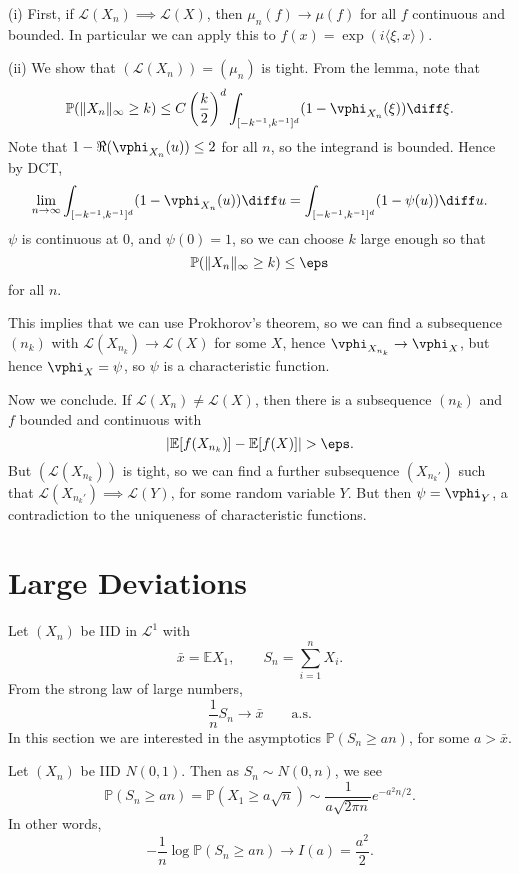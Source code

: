\documentclass[12pt]{article}
\begin{document}
\begin{proofbox}
	

	(i) First, if $\mathcal{L}(X_n) \implies \mathcal{L}(X)$, then $\mu_n(f) \to \mu(f)$ for all $f$ continuous and bounded. In particular we can apply this to $f(x) = \exp(i \langle \xi, x \rangle)$.

	(ii) We show that $(\mathcal{L}(X_n)) = (\mu_n)$ is tight. From the lemma, note that
	\[
		\mathbb{P}(\|X_n\|_\infty \geq k) \leq C \left( \frac{k}{2} \right)^d \int_{[-k^{-1}, k^{-1}]^{d}} (1 - \vphi_{X_n}(\xi)) \diff \xi.
	\]
	Note that $1 - \Re(\vphi_{X_n}(u)) \leq 2$ for all $n$, so the integrand is bounded. Hence by DCT,
	\[
		\lim_{n \to \infty} \int_{[-k^{-1}, k^{-1}]^{d}} (1 - \vphi_{X_n}(u)) \diff u = \int_{[-k^{-1}, k^{-1}]^{d}} (1 - \psi(u)) \diff u.
	\]
	$\psi$ is continuous at $0$, and $\psi(0) = 1$, so we can choose $k$ large enough so that
	\[
	\mathbb{P}(\|X_n\|_\infty \geq k) \leq \eps
	\]
	for all $n$.

	This implies that we can use Prokhorov's theorem, so we can find a subsequence $(n_k)$ with $\mathcal{L}(X_{n_k}) \to \mathcal{L}(X)$ for some $X$, hence $\vphi_{X_{n_k}} \to \vphi_X$, but hence $\vphi_X = \psi$, so $\psi$ is a characteristic function.

	Now we conclude. If $\mathcal{L}(X_n) \neq \mathcal{L}(X)$, then there is a subsequence $(n_k)$ and $f$ bounded and continuous with
	\[
	|\mathbb{E}[f(X_{n_k})] - \mathbb{E}[f(X)]| > \eps.
	\]
	But $(\mathcal{L}(X_{n_k}))$ is tight, so we can find a further subsequence $(X_{n_k'})$ such that $\mathcal{L}(X_{n_k'}) \implies \mathcal{L}(Y)$, for some random variable $Y$. But then $\psi = \vphi_Y$, a contradiction to the uniqueness of characteristic functions.
\end{proofbox}


\newpage

\section{Large Deviations}%
\label{sec:ld}

Let $(X_n)$ be IID in $\mathcal{L}^1$ with
\[
\bar x = \mathbb{E} X_1, \qquad S_n = \sum_{i = 1}^n X_i.
\]
From the strong law of large numbers,
\[
	\frac{1}{n} S_n \to \bar x \qquad \text{a.s.}
\]
In this section we are interested in the asymptotics $\mathbb{P}(S_n \geq an)$, for some $a > \bar x$.

\begin{exbox}
	Let $(X_n)$ be IID $N(0, 1)$. Then as $S_n \sim N(0, n)$, we see
	\[
		\mathbb{P}(S_n \geq an) = \mathbb{P}(X_1 \geq a \sqrt n) \sim \frac{1}{a \sqrt{2 \pi n}} e^{-a^2n/2}.
	\]
	In other words,
	\[
	-\frac{1}{n} \log \mathbb{P}(S_n \geq an) \to I(a) = \frac{a^2}{2}.
	\]
\end{exbox}
\end{document}
